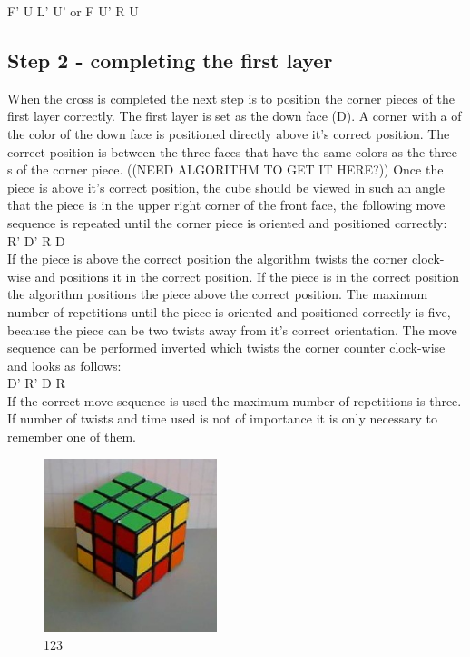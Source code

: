 F' U L' U' or F U' R U

\subsection{Step 2 - completing the first layer}
When the cross is completed the next step is to position the corner pieces of the first layer correctly. The first layer is set as the down face (D). A corner with a \facet{} of the color of the down face is positioned directly above it's correct  position. The correct position is between the three faces that have the same colors as the three \facet{}s of the corner piece. ((NEED ALGORITHM TO GET IT HERE?)) Once the piece is above it's correct position, the cube should be viewed in such an angle that the piece is in the upper right corner of the front face, the following move sequence is repeated until the corner piece is oriented and positioned correctly: \\

R' D' R D \\

If the piece is above the correct position the algorithm twists the corner clock-wise and positions it in the correct position. If the piece is in the correct position the algorithm positions the piece above the correct position. The maximum number of repetitions until the piece is oriented and positioned correctly is five, because the piece can be two twists away from it's correct orientation. 
The move sequence can be performed inverted which twists the corner counter clock-wise and looks as follows: \\

D' R' D R \\

If the correct move sequence is used the maximum number of repetitions is three. If number of twists and time used is not of importance it is only necessary to remember one of them.

\begin{figure}
\begin{center}
	\includegraphics[width=0.45\textwidth]{input/pics/2FL.jpg}	
\end{center}
\caption{123}
\label{fig:2FL}
\end{figure}

